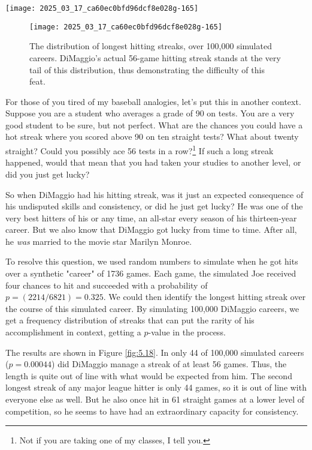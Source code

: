 \documentclass[10pt]{article}
\begin{document}
\texttt{[image: 2025\_03\_17\_ca60ec0bfd96dcf8e028g-165]}

\begin{figure}[H]
\centering
\texttt{[image: 2025\_03\_17\_ca60ec0bfd96dcf8e028g-165]}
\caption{The distribution of longest hitting streaks, over 100,000 simulated careers. DiMaggio's actual 56-game hitting streak stands at the very tail of this distribution, thus demonstrating the difficulty of this feat.}
\end{figure}

For those of you tired of my baseball analogies, let's put this in another context. Suppose you are a student who averages a grade of 90 on tests. You are a very good student to be sure, but not perfect. What are the chances you could have a hot streak where you scored above 90 on ten straight tests? What about twenty straight? Could you possibly ace 56 tests in a row?\footnote{Not if you are taking one of my classes, I tell you.} If such a long streak happened, would that mean that you had taken your studies to another level, or did you just get lucky?

So when DiMaggio had his hitting streak, was it just an expected consequence of his undisputed skills and consistency, or did he just get lucky? He was one of the very best hitters of his or any time, an all-star every season of his thirteen-year career. But we also know that DiMaggio got lucky from time to time. After all, he \textit{was} married to the movie star Marilyn Monroe.

To resolve this question, we used random numbers to simulate when he got hits over a synthetic "career" of 1736 games. Each game, the simulated Joe received four chances to hit and succeeded with a probability of $p = (2214 / 6821) = 0.325$. We could then identify the longest hitting streak over the course of this simulated career. By simulating 100,000 DiMaggio careers, we get a frequency distribution of streaks that can put the rarity of his accomplishment in context, getting a $p$-value in the process.

The results are shown in Figure \ref{fig:5.18}. In only 44 of 100,000 simulated careers ($p = 0.00044$) did DiMaggio manage a streak of at least 56 games. Thus, the length is quite out of line with what would be expected from him. The second longest streak of any major league hitter is only 44 games, so it is out of line with everyone else as well. But he also once hit in 61 straight games at a lower level of competition, so he seems to have had an extraordinary capacity for consistency.
\end{document}
